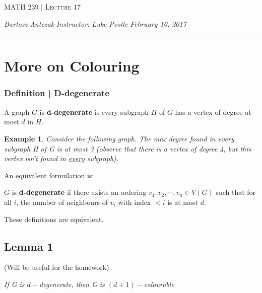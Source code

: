 \documentclass{report}
\newcommand{\lectureNum}{17}
\newcommand{\curDate}{February 10, 2017}
\newcommand{\course}{MATH 239}
\newcommand{\instructor}{Luke Postle}
\newtheorem{ex}{Example}[section]
\begin{document}
\begin{center}
\begin{Large}
\textsc{\course{} | Lecture \lectureNum{}}
\end{Large}
\end{center} 
\noindent \textit{Bartosz Antczak} \hfill
\textit{Instructor: \instructor{}} \hfill
\textit{\curDate{}}
\rule{\textwidth}{0.4pt}
\section{More on Colouring}
\subsubsection{Definition | D-degenerate}
A graph $G$ is \textbf{d-degenerate} is every subgraph $H$ of $G$ has a vertex of degree at most $d$ in $H$.
\begin{ex}
Consider the following graph. The max degree found in every subgraph H of G is at most 3 (observe that there is a vertex of degree 4, but this vertex isn't found in \underline{every} subgraph).
\end{ex}
\begin{center}
\end{center}
An equivalent formulation is:
\begin{center}
$G$ is \textbf{d-degenerate} if there exists an ordering $v_1, v_2, \cdots, v_n \in V(G)$ such that for all $i$, the number of neighbours of $v_i$ with index $< i$ is at most $d$.
\end{center}
These definitions are equivalent. 
\subsection{Lemma 1} (Will be useful for the homework)
\begin{center}
\textit{If G is $d-$degenerate, then G is $(d+1)-$colourable}
\end{center}
\end{document}
